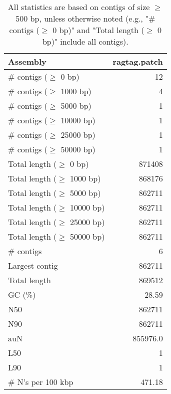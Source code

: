\documentclass[12pt,a4paper]{article}
\begin{document}
\begin{table}[ht]
\begin{center}
\caption{All statistics are based on contigs of size $\geq$ 500 bp, unless otherwise noted (e.g., "\# contigs ($\geq$ 0 bp)" and "Total length ($\geq$ 0 bp)" include all contigs).}
\begin{tabular}{|l*{1}{|r}|}
\hline
Assembly & ragtag.patch \\ \hline
\# contigs ($\geq$ 0 bp) & 12 \\ \hline
\# contigs ($\geq$ 1000 bp) & 4 \\ \hline
\# contigs ($\geq$ 5000 bp) & 1 \\ \hline
\# contigs ($\geq$ 10000 bp) & 1 \\ \hline
\# contigs ($\geq$ 25000 bp) & 1 \\ \hline
\# contigs ($\geq$ 50000 bp) & 1 \\ \hline
Total length ($\geq$ 0 bp) & 871408 \\ \hline
Total length ($\geq$ 1000 bp) & 868176 \\ \hline
Total length ($\geq$ 5000 bp) & 862711 \\ \hline
Total length ($\geq$ 10000 bp) & 862711 \\ \hline
Total length ($\geq$ 25000 bp) & 862711 \\ \hline
Total length ($\geq$ 50000 bp) & 862711 \\ \hline
\# contigs & 6 \\ \hline
Largest contig & 862711 \\ \hline
Total length & 869512 \\ \hline
GC (\%) & 28.59 \\ \hline
N50 & 862711 \\ \hline
N90 & 862711 \\ \hline
auN & 855976.0 \\ \hline
L50 & 1 \\ \hline
L90 & 1 \\ \hline
\# N's per 100 kbp & 471.18 \\ \hline
\end{tabular}
\end{center}
\end{table}
\end{document}
